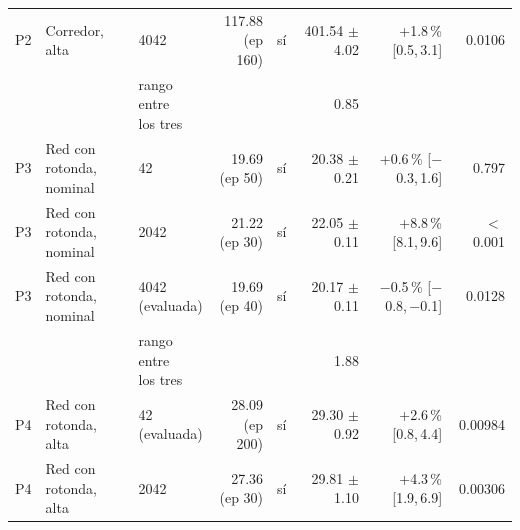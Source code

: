 \begin{table}[H]
\begin{tabular}{lllrlrrr}
P2 & \makecell[l]{Corredor,\\{}alta} & 4042 & \makecell[r]{117.88\\{}(ep 160)} & sí & \makecell[r]{401.54\\{}$\pm$ 4.02} & \makecell[r]{+1.8\,\%\\{}[0.5,\,3.1]} & 0.0106 \\
 & & \makecell[l]{rango entre\\{}los tres} & & & 0.85 & & \\
P3 & \makecell[l]{Red con rotonda,\\{}nominal} & 42 & \makecell[r]{19.69\\{}(ep 50)} & sí & \makecell[r]{20.38\\{}$\pm$ 0.21} & \makecell[r]{+0.6\,\%\\{}[$-$0.3,\,1.6]} & 0.797 \\
P3 & \makecell[l]{Red con rotonda,\\{}nominal} & 2042 & \makecell[r]{21.22\\{}(ep 30)} & sí & \makecell[r]{22.05\\{}$\pm$ 0.11} & \makecell[r]{+8.8\,\%\\{}[8.1,\,9.6]} & $<$\,0.001 \\
P3 & \makecell[l]{Red con rotonda,\\{}nominal} & \makecell[l]{4042\\{}(evaluada)} & \makecell[r]{19.69\\{}(ep 40)} & sí & \makecell[r]{20.17\\{}$\pm$ 0.11} & \makecell[r]{$-$0.5\,\%\\{}[$-$0.8,\,$-$0.1]} & 0.0128 \\
 & & \makecell[l]{rango entre\\{}los tres} & & & 1.88 & & \\
P4 & \makecell[l]{Red con rotonda,\\{}alta} & \makecell[l]{42\\{}(evaluada)} & \makecell[r]{28.09\\{}(ep 200)} & sí & \makecell[r]{29.30\\{}$\pm$ 0.92} & \makecell[r]{+2.6\,\%\\{}[0.8,\,4.4]} & 0.00984 \\
P4 & \makecell[l]{Red con rotonda,\\{}alta} & 2042 & \makecell[r]{27.36\\{}(ep 30)} & sí & \makecell[r]{29.81\\{}$\pm$ 1.10} & \makecell[r]{+4.3\,\%\\{}[1.9,\,6.9]} & 0.00306 \\

\end{tabular}
\end{table}
